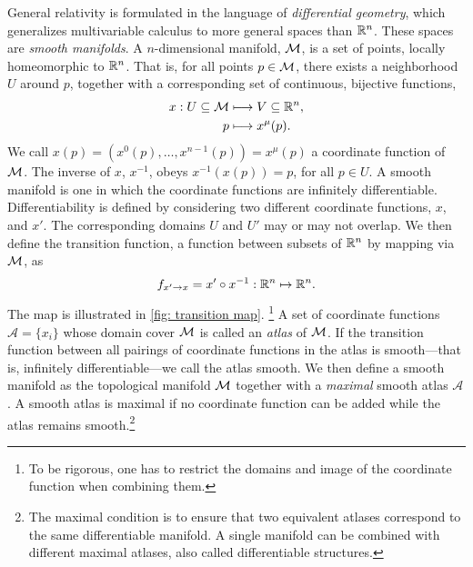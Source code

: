 General relativity is formulated in the language of \emph{differential geometry}, which generalizes multivariable calculus to more general spaces than $\mathbb{R}^n$.
These spaces are \emph{smooth manifolds}.
A $n$-dimensional manifold, $\mathcal{M}$, is a set of points, locally homeomorphic to $\mathbb{R}^n$.
That is, for all points $p \in \mathcal{M}$, there exists a neighborhood $U$ around $p$, together with a corresponding set of continuous, bijective functions,
%
\begin{align}
    x: U \subseteq \mathcal{M} & \longmapsto V \subseteq \mathbb{R}^n, \\
    p & \longmapsto x^\mu(p).
\end{align}
%
We call $x(p) = (x^0(p), \dots, x^{n- 1}(p)) = x^\mu(p)$ a coordinate function of $\mathcal{M}$.
The inverse of $x$, $x^{-1}$, obeys $x^{-1}(x(p)) = p$, for all $p \in U$.
A smooth manifold is one in which the coordinate functions are infinitely differentiable.
Differentiability is defined by considering two different coordinate functions, $x$, and $x'$.
The corresponding domains $U$ and $U'$ may or may not overlap.
We then define the transition function, a function between subsets of $\mathbb{R}^n$ by mapping via $\mathcal{M}$, as
%
\begin{align}
    f_{x'\rightarrow x} = x' \circ x^{-1} : \mathbb{R}^n \mapsto \mathbb{R}^n.
\end{align}
%
The map is illustrated in \autoref{fig: transition map}.
\footnote{To be rigorous, one has to restrict the domains and image of the coordinate function when combining them.}
A set of coordinate functions $\mathcal A = \{x_i\}$ whose domain cover $\mathcal{M}$ is called an \emph{atlas} of $\mathcal{M}$.
If the transition function between all pairings of coordinate functions in the atlas is smooth---that is, infinitely differentiable---we call the atlas smooth.
We then define a smooth manifold as the topological manifold $\mathcal{M}$ together with a \emph{maximal} smooth atlas $\mathcal A$.
A smooth atlas is maximal if no coordinate function can be added while the atlas remains smooth.\footnote{%
    The maximal condition is to ensure that two equivalent atlases correspond to the same differentiable manifold. A single manifold can be combined with different maximal atlases, also called differentiable structures. 
    }
%
